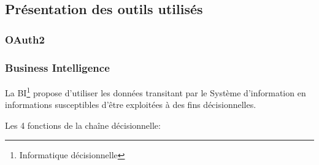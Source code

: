\subsection{Présentation des outils utilisés}

\subsubsection{OAuth2}



\subsubsection{Business Intelligence}

La \acrfull{BI}\footnote{Informatique décisionnelle} propose d'utiliser les
données transitant par le Système d'information en informations susceptibles
d'être exploitées à des fins décisionnelles.


Les 4 fonctions de la chaîne décisionnelle:


